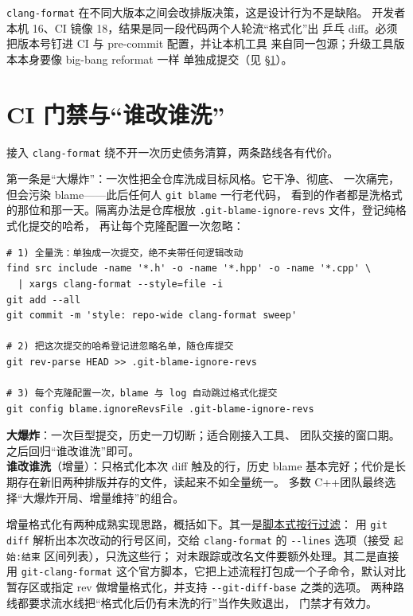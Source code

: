 \documentclass[12pt,a4paper,fontset=fandol]{ctexbook}
\newcommand{\Tp}[1]{\texttt{#1}}
\newcommand{\Opt}[1]{\texttt{-\/-#1}}
\newcommand{\Lang}[1]{\textsf{#1}}
\newcommand{\CPP}{\Lang{C++}}
\begin{document}
\begin{warning}[title={版本不一致等于没有门禁}]
\Tp{clang-format} 在不同大版本之间会改排版决策，这是设计行为不是缺陷。
开发者本机 16、CI 镜像 18，结果是同一段代码两个人轮流``格式化''出
乒乓 diff。必须把版本号钉进 CI 与 pre-commit 配置，并让本机工具
来自同一包源；升级工具版本本身要像 big-bang reformat 一样
单独成提交（见 \S\ref{sec:ch13-ci}）。
\end{warning}

\section{CI 门禁与``谁改谁洗''}
\label{sec:ch13-ci}

接入 \Tp{clang-format} 绕不开一次历史债务清算，两条路线各有代价。

第一条是``大爆炸''：一次性把全仓库洗成目标风格。它干净、彻底、
一次痛完，但会污染 blame——此后任何人 \Tp{git blame} 一行老代码，
看到的作者都是洗格式的那位和那一天。隔离办法是仓库根放
\Tp{.git-blame-ignore-revs} 文件，登记纯格式化提交的哈希，
再让每个克隆配置一次忽略：

\begin{lstlisting}[style=shellstyle]
# 1) 全量洗：单独成一次提交，绝不夹带任何逻辑改动
find src include -name '*.h' -o -name '*.hpp' -o -name '*.cpp' \
  | xargs clang-format --style=file -i
git add --all
git commit -m 'style: repo-wide clang-format sweep'

# 2) 把这次提交的哈希登记进忽略名单，随仓库提交
git rev-parse HEAD >> .git-blame-ignore-revs

# 3) 每个克隆配置一次，blame 与 log 自动跳过格式化提交
git config blame.ignoreRevsFile .git-blame-ignore-revs
\end{lstlisting}

\begin{compare}[title={大爆炸 vs 谁改谁洗}]
\textbf{大爆炸}：一次巨型提交，历史一刀切断；适合刚接入工具、
团队交接的窗口期。之后回归``谁改谁洗''即可。\\
\textbf{谁改谁洗}（增量）：只格式化本次 diff 触及的行，历史 blame
基本完好；代价是长期存在新旧两种排版并存的文件，读起来不如全量统一。
多数 \CPP 团队最终选择``大爆炸开局、增量维持''的组合。
\end{compare}

增量格式化有两种成熟实现思路，概括如下。其一是\underline{脚本式按行过滤}：
用 \Tp{git diff} 解析出本次改动的行号区间，交给 \Tp{clang-format}
的 \Opt{lines} 选项（接受 \Tp{起始:结束} 区间列表），只洗这些行；
对未跟踪或改名文件要额外处理。其二是直接用 \Tp{git-clang-format}
这个官方脚本，它把上述流程打包成一个子命令，默认对比暂存区或指定
rev 做增量格式化，并支持 \Opt{git-diff-base} 之类的选项。
两种路线都要求流水线把``格式化后仍有未洗的行''当作失败退出，
门禁才有效力。
\end{document}
